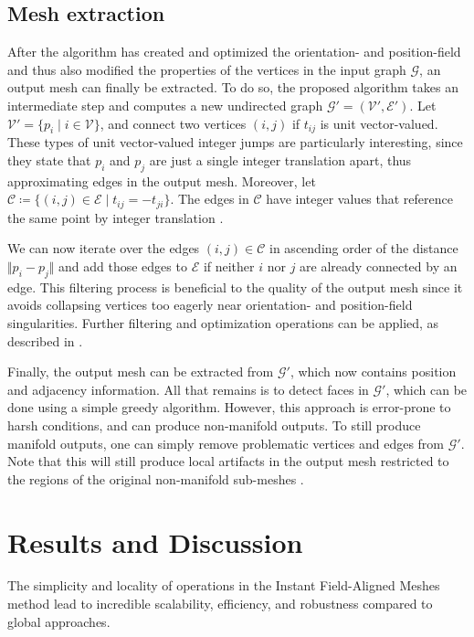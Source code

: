 \documentclass{ACGSeminar}
\begin{document}
\subsection{Mesh extraction}
After the algorithm has created and optimized the orientation- and position-field and thus also modified the properties of the vertices in the input graph $\mathcal{G}$, an output mesh can finally be extracted. To do so, the proposed algorithm takes an intermediate step and computes a new undirected graph $\mathcal{G}' = (\mathcal{V}', \mathcal{E}')$. Let $\mathcal{V}' = \{p_i \mid i \in \mathcal{V}\}$, and connect two vertices $(i,j)$ if $t_{ij}$ is unit vector-valued. These types of unit vector-valued integer jumps are particularly interesting, since they state that $p_i$ and $p_j$ are just a single integer translation apart, thus approximating edges in the output mesh. Moreover, let $\mathcal{C} \coloneqq \{(i,j) \in \mathcal{E} \mid t_{ij} = -t_{ji}\}$. The edges in $\mathcal{C}$ have integer values that reference the same point by integer translation \cite{jakob2015instant}.

We can now iterate over the edges $(i,j) \in \mathcal{C}$ in ascending order of the distance $\Vert p_i - p_j \Vert$ and add those edges to $\mathcal{E}$ if neither $i$ nor $j$ are already connected by an edge. This filtering process is beneficial to the quality of the output mesh since it avoids collapsing vertices too eagerly near orientation- and position-field singularities. Further filtering and optimization operations can be applied, as described in \cite{jakob2015instant}.\bigskip

Finally, the output mesh can be extracted from $\mathcal{G}'$, which now contains position and adjacency information. All that remains is to detect faces in $\mathcal{G}'$, which can be done using a simple greedy algorithm. However, this approach is error-prone to harsh conditions, and can produce non-manifold outputs. To still produce manifold outputs, one can simply remove problematic vertices and edges from $\mathcal{G}'$. Note that this will still produce local artifacts in the output mesh restricted to the regions of the original non-manifold sub-meshes \cite{jakob2015instant}.

\section{Results and Discussion}\label{results}
The simplicity and locality of operations in the Instant Field-Aligned Meshes method lead to incredible scalability, efficiency, and robustness compared to global approaches.
\end{document}
